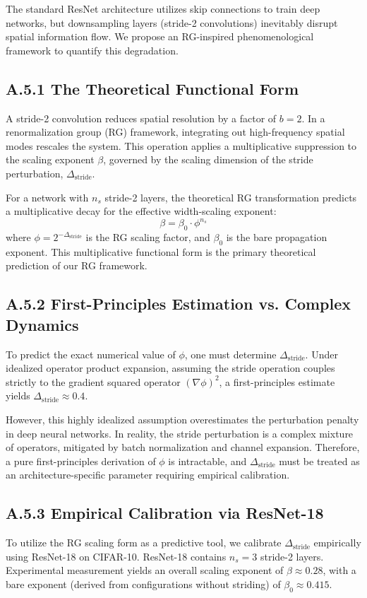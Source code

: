 The standard ResNet architecture utilizes skip connections to train deep networks, but downsampling layers (stride-2 convolutions) inevitably disrupt spatial information flow. We propose an RG-inspired phenomenological framework to quantify this degradation.

\subsection*{A.5.1 The Theoretical Functional Form}
A stride-2 convolution reduces spatial resolution by a factor of $b=2$. In a renormalization group (RG) framework, integrating out high-frequency spatial modes rescales the system. This operation applies a multiplicative suppression to the scaling exponent $\beta$, governed by the scaling dimension of the stride perturbation, $\Delta_{\mathrm{stride}}$.

For a network with $n_s$ stride-2 layers, the theoretical RG transformation predicts a multiplicative decay for the effective width-scaling exponent:
\begin{equation}
\beta = \beta_0 \cdot \phi^{n_s}
\end{equation}
where $\phi = 2^{-\Delta_{\mathrm{stride}}}$ is the RG scaling factor, and $\beta_0$ is the bare propagation exponent. This multiplicative functional form is the primary theoretical prediction of our RG framework.

\subsection*{A.5.2 First-Principles Estimation vs. Complex Dynamics}
To predict the exact numerical value of $\phi$, one must determine $\Delta_{\mathrm{stride}}$. Under idealized operator product expansion, assuming the stride operation couples strictly to the gradient squared operator $(\nabla\phi)^2$, a first-principles estimate yields $\Delta_{\mathrm{stride}} \approx 0.4$.

However, this highly idealized assumption overestimates the perturbation penalty in deep neural networks. In reality, the stride perturbation is a complex mixture of operators, mitigated by batch normalization and channel expansion. Therefore, a pure first-principles derivation of $\phi$ is intractable, and $\Delta_{\mathrm{stride}}$ must be treated as an architecture-specific parameter requiring empirical calibration.

\subsection*{A.5.3 Empirical Calibration via ResNet-18}
To utilize the RG scaling form as a predictive tool, we calibrate $\Delta_{\mathrm{stride}}$ empirically using ResNet-18 on CIFAR-10. ResNet-18 contains $n_s = 3$ stride-2 layers. Experimental measurement yields an overall scaling exponent of $\beta \approx 0.28$, with a bare exponent (derived from configurations without striding) of $\beta_0 \approx 0.415$.

